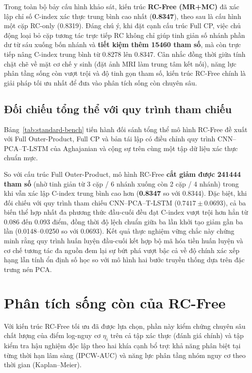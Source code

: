 Trong toàn bộ bảy cấu hình khảo sát, kiến trúc \textbf{RC-Free (MR+MC)} đã xác lập chỉ số C-index xác thực trung bình cao nhất (\textbf{0.8347}), theo sau là cấu hình một cặp RC-only (0.8319). Đáng chú ý, khi đặt cạnh cấu trúc Full CP, việc chủ động loại bỏ cặp tương tác trực tiếp RC không chỉ giúp tinh giản số nhánh phần dư từ sáu xuống bốn nhánh và \textbf{tiết kiệm thêm 15460 tham số}, mà còn trực tiếp nâng C-index trung bình từ 0.8278 lên 0.8347. Cân nhắc đồng thời giữa tính chặt chẽ về mặt cơ chế y sinh (đặt ảnh MRI làm trung tâm kết nối), năng lực phân tầng sống còn vượt trội và độ tinh gọn tham số, kiến trúc RC-Free chính là giải pháp tối ưu nhất để đưa vào phân tích sống còn chuyên sâu.

\subsection{Đối chiếu tổng thể với quy trình tham chiếu}
Bảng~\ref{tab:standard-bench} tiến hành đối sánh tổng thể mô hình RC-Free đề xuất với Full Outer-Product, Full CP và bản tái lập có điều chỉnh quy trình CNN--PCA--T-LSTM của Aghajanian và cộng sự trên cùng một tập dữ liệu xác thực chuẩn mực.



So với cấu trúc Full Outer-Product, mô hình RC-Free \textbf{cắt giảm được 241444 tham số} (nhờ tinh giản từ 3 cặp / 6 nhánh xuống còn 2 cặp / 4 nhánh) trong khi vẫn xác lập C-index trung bình cao hơn (\textbf{0.8347} so với 0.8344). Đặc biệt, khi đối chiếu với quy trình tham chiếu CNN--PCA--T-LSTM ($0.7417\pm0.0693$), cả ba biến thể hợp nhất đa phương thức đầu-cuối đều đạt C-index vượt trội hơn hẳn từ 0.086 đến 0.093 điểm, đồng thời độ lệch chuẩn giữa ba lần khởi tạo giảm gần ba lần (0.0148--0.0250 so với 0.0693). Kết quả thực nghiệm vững chắc này chứng minh rằng quy trình huấn luyện đầu-cuối kết hợp bộ mã hóa tiền huấn luyện và cơ chế tương tác đa nguồn đem lại sự bứt phá vượt bậc cả về độ chính xác xếp hạng lẫn tính ổn định số học so với mô hình hai bước truyền thống dựa trên đặc trưng nén PCA.

\section{Phân tích sống còn của RC-Free}
\label{sec:posthoc-test}
\label{sec:survival-results}
Với kiến trúc RC-Free tối ưu đã được lựa chọn, phần này kiểm chứng chuyên sâu chất lượng của điểm log-nguy cơ $\eta_i$ trên cả tập xác thực (đánh giá chính) và tập kiểm tra hậu nghiệm độc lập theo hai khía cạnh bổ trợ: khả năng phân biệt tại từng thời hạn lâm sàng (IPCW-AUC) và năng lực phân tầng nhóm nguy cơ theo thời gian (Kaplan--Meier).

